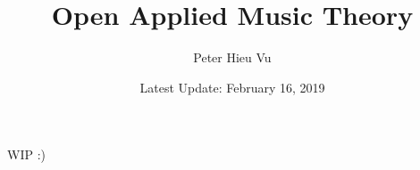 \documentclass[12pt]{book}
\title{Open Applied Music Theory}
\author{Peter Hieu Vu}
\date{Latest Update: February 16, 2019}
\begin{document}
    \maketitle
    
    WIP :)
    
\end{document}
